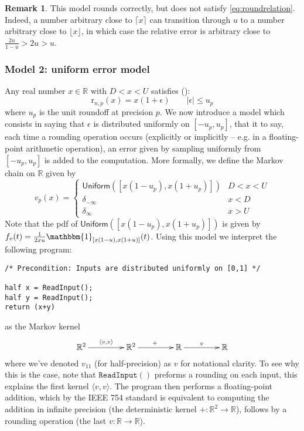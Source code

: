 \documentclass[10pt,a4paper]{article}
\theoremstyle{plain}
\theoremstyle{definition}
\newtheorem{remark}[theorem]{Remark}
\newcommand{\R}{\mathbb{R}}
\newcommand{\Round}[1][n,p]{\mathrm{r}_{#1}}
\newcommand{\one}{\mathbbm{1}}
\newcommand{\Unif}{\mathsf{Uniform}}
\newcommand{\ceil}[1]{\lceil #1 \rceil}
\newcommand{\floor}[1]{\lfloor #1 \rfloor}
\newcommand{\absv}[1]{\vert #1\vert}
\newcommand{\uro}[1][p]{u_{#1}}
\begin{document}
\begin{remark}
This model rounds correctly, but does not satisfy \eqref{eq:roundrelation}. Indeed, a number arbitrary close to $\ceil{x}$ can transition through $u$ to a number arbitrary close to $\floor{x}$, in which case the relative error is arbitrary close to $\frac{2u}{1-u}>2u>u$.
\end{remark}

\subsubsection{Model 2: uniform error model}

Any real number $x\in\R$ with $D< x< U$ satisfies (\cite[Th. 2.2]{higham2002accuracy}):
\begin{equation}\label{eq:roundrelation}
\Round(x)=x(1+\epsilon)\qquad\absv{\epsilon}\leq \uro
\end{equation}
where $\uro$ is the unit roundoff at precision $p$. We now introduce a model which consists in saying that $\epsilon$ is distributed uniformly on $\left[ -\uro,\uro\right]$, that it to say, each time a rounding operation occurs (explicitly or implicitly -- e.g. in a floating-point arithmetic operation), an error given by sampling uniformly from $\left[ -\uro,\uro\right]$ is added to the computation. More formally, we define the Markov chain on $\R$ given by
\[
v_{p}(x)=\begin{cases}
\Unif\left(\left[x(1-\uro),x(1+\uro)\right]\right) & D<x<U\\
\delta_{-\infty}& x< D\\
\delta_{\infty} & x>U
\end{cases}
\]
Note that the pdf of $\Unif\left(\left[x(1-\uro),x(1+\uro)\right]\right)$ is given by $f_v(t)=\frac{1}{2xu}\one_{\left[x(1-u),x(1+u)\right]}(t)$. 
Using this model we interpret the following program:
\begin{lstlisting}
/* Precondition: Inputs are distributed uniformly on [0,1] */

half x = ReadInput();
half y = ReadInput();
return (x+y) 
\end{lstlisting}
as the Markov kernel
\[
\xymatrix@C=10ex
{
\R^2 \ar[r]^{\langle v,v\rangle} & \R^2\ar[r]^{+} & \R\ar[r]^{v} & \R
}
\]
where we've denoted $v_{11}$ (for half-precision) as $v$ for notational clarity. To see why this is the case, note that $\mathtt{ReadInput()}$ preforms a rounding on each input, this explains the first kernel $\langle v,v\rangle$. The program then performs a floating-point addition, which by the IEEE 754 standard is equivalent to computing the addition in infinite precision (the deterministic kernel $+:\R^2\to\R$), follows by a rounding operation (the last $v:\R\to\R$).
\end{document}
